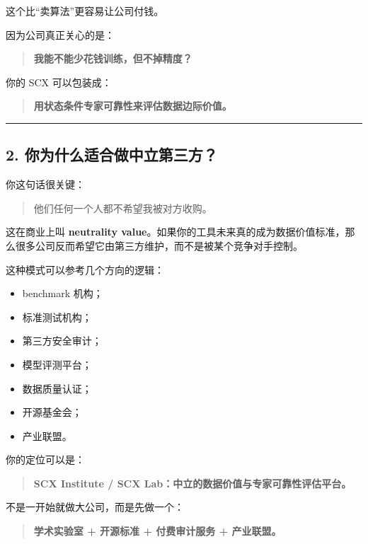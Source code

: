 \documentclass[
  12pt,
]{ctexart}
\providecommand{\tightlist}{%
  \setlength{\itemsep}{0pt}\setlength{\parskip}{0pt}}
\begin{document}
这个比``卖算法''更容易让公司付钱。

因为公司真正关心的是：

\begin{quote}
\textbf{我能不能少花钱训练，但不掉精度？}
\end{quote}

你的 SCX 可以包装成：

\begin{quote}
\textbf{用状态条件专家可靠性来评估数据边际价值。}
\end{quote}

\begin{center}\rule{0.5\linewidth}{0.5pt}\end{center}

\subsection{2.
你为什么适合做中立第三方？}\label{ux4f60ux4e3aux4ec0ux4e48ux9002ux5408ux505aux4e2dux7acbux7b2cux4e09ux65b9}

你这句话很关键：

\begin{quote}
他们任何一个人都不希望我被对方收购。
\end{quote}

这在商业上叫 \textbf{neutrality
value}。如果你的工具未来真的成为数据价值标准，那么很多公司反而希望它由第三方维护，而不是被某个竞争对手控制。

这种模式可以参考几个方向的逻辑：

\begin{itemize}
\tightlist
\item
  benchmark 机构；
\item
  标准测试机构；
\item
  第三方安全审计；
\item
  模型评测平台；
\item
  数据质量认证；
\item
  开源基金会；
\item
  产业联盟。
\end{itemize}

你的定位可以是：

\begin{quote}
\textbf{SCX Institute / SCX Lab：中立的数据价值与专家可靠性评估平台。}
\end{quote}

不是一开始就做大公司，而是先做一个：

\begin{quote}
\textbf{学术实验室 + 开源标准 + 付费审计服务 + 产业联盟。}
\end{quote}
\end{document}
